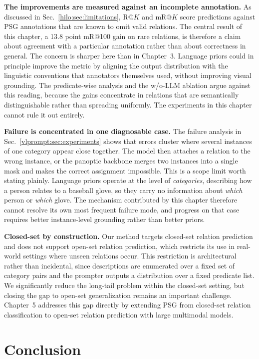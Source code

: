 \noindent \textbf{The improvements are measured against an incomplete annotation.}
As discussed in Sec.~\ref{hilo:sec:limitations}, R@$K$ and mR@$K$ score predictions against PSG annotations that are known to omit valid relations. The central result of this chapter, a 13.8 point mR@100 gain on rare relations, is therefore a claim about agreement with a particular annotation rather than about correctness in general. The concern is sharper here than in Chapter~3. Language priors could in principle improve the metric by aligning the output distribution with the linguistic conventions that annotators themselves used, without improving visual grounding. The predicate-wise analysis and the w/o-LLM ablation argue against this reading, because the gains concentrate in relations that are semantically distinguishable rather than spreading uniformly. The experiments in this chapter cannot rule it out entirely.

\noindent \textbf{Failure is concentrated in one diagnosable case.}
The failure analysis in Sec.~\ref{vlprompt:sec:experiments} shows that errors cluster where several instances of one category appear close together. The model then attaches a relation to the wrong instance, or the panoptic backbone merges two instances into a single mask and makes the correct assignment impossible. This is a scope limit worth stating plainly. Language priors operate at the level of \emph{categories}, describing how a person relates to a baseball glove, so they carry no information about \emph{which} person or \emph{which} glove. The mechanism contributed by this chapter therefore cannot resolve its own most frequent failure mode, and progress on that case requires better instance-level grounding rather than better priors.

\noindent \textbf{Closed-set by construction.}
Our method targets closed-set relation prediction and does not support open-set relation prediction, which restricts its use in real-world settings where unseen relations occur. This restriction is architectural rather than incidental, since descriptions are enumerated over a fixed set of category pairs and the prompter outputs a distribution over a fixed predicate list. We significantly reduce the long-tail problem within the closed-set setting, but closing the gap to open-set generalization remains an important challenge. Chapter~5 addresses this gap directly by extending PSG from closed-set relation classification to open-set relation prediction with large multimodal models.

\section{Conclusion}
\label{sec:conclusion}

